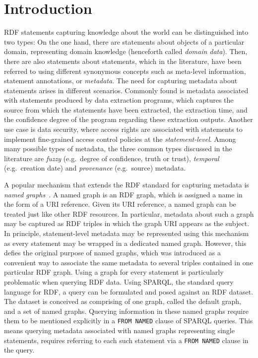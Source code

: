 \section{Introduction}
RDF statements capturing knowledge about the world can be distinguished into two types: On the one hand, there are statements about objects of a particular domain, representing domain knowledge (henceforth called \emph{domain data}). Then, there are also statements about statements, which in the  literature, have been referred to using different synonymous concepts such as meta-level information, statement annotations, or \emph{metadata}. The need for capturing metadata about statements arises in different scenarios. Commonly found is metadata associated with statements produced by data extraction programs, which captures the source from which the statements have been extracted, the extraction time, and the confidence degree of the program regarding these extraction outputs. Another use case is data security, where access rights are associated with statements to implement fine-grained access control policies at the \emph{statement-level}. Among many possible types of metadata, the three common types discussed in the literature are \emph{fuzzy} (e.g.~degree of confidence, truth or trust), \emph{temporal} (e.g.~creation date) and \emph{provenance} (e.g.~source) metadata. 

A popular mechanism that extends the RDF standard for capturing metadata is \emph{named graphs}~\cite{DBLP:journals/ws/CarrollBHS05}. A named graph is an RDF graph, which is assigned
a name in the form of a URI reference. Given its URI reference, a named graph can be treated just like other RDF resources. In particular, metadata about such a graph may be captured as RDF triples in which the graph URI appears as the subject. In principle, statement-level metadata may be represented using this mechanism as every statement may be wrapped in a dedicated named graph. However, this defies the original purpose of named graphs, which was introduced as a convenient way to associate the same metadata to several triples contained in one particular RDF graph. Using a graph for every statement is particularly problematic when querying RDF data. Using SPARQL, the standard query language for RDF, a query can be formulated and posed against an RDF dataset. The dataset is conceived as comprising of one graph, called the default graph, and a set of named graphs. Querying information in these named graphs require them to be mentioned explicitly in a \verb+FROM NAMED+ clause of SPARQL queries. This means querying metadata associated with named graphs representing single statements, requires referring to each such statement via a \verb+FROM NAMED+ clause in the query.

